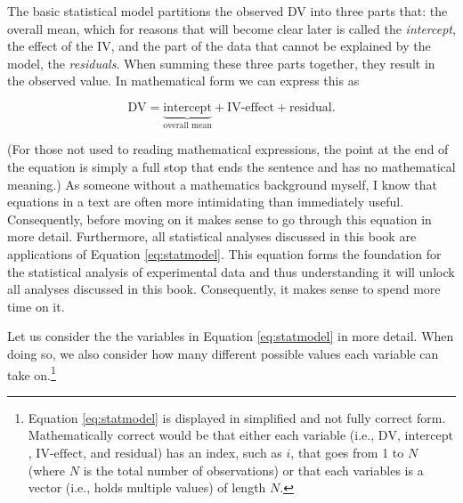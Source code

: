 \documentclass[
]{book}
\begin{document}
The basic statistical model partitions the observed DV into three parts that: the overall mean, which for reasons that will become clear later is called the \emph{intercept}, the effect of the IV, and the part of the data that cannot be explained by the model, the \emph{residuals}. When summing these three parts together, they result in the observed value. In mathematical form we can express this as

\begin{equation}
\text{DV} = \underbrace{\text{intercept}}_{\text{overall mean}} + \text{IV-effect} + \text{residual}.
\label{eq:statmodel}
\end{equation}

(For those not used to reading mathematical expressions, the point at the end of the equation is simply a full stop that ends the sentence and has no mathematical meaning.) As someone without a mathematics background myself, I know that equations in a text are often more intimidating than immediately useful. Consequently, before moving on it makes sense to go through this equation in more detail. Furthermore, all statistical analyses discussed in this book are applications of Equation \eqref{eq:statmodel}. This equation forms the foundation for the statistical analysis of experimental data and thus understanding it will unlock all analyses discussed in this book. Consequently, it makes sense to spend more time on it.

Let us consider the the variables in Equation \eqref{eq:statmodel} in more detail. When doing so, we also consider how many different possible values each variable can take on.\footnote{Equation \eqref{eq:statmodel} is displayed in simplified and not fully correct form. Mathematically correct would be that either each variable (i.e., \(\text{DV}\), \(\text{intercept}\), \(\text{IV-effect}\), and \(\text{residual}\)) has an index, such as \(i\), that goes from 1 to \(N\) (where \(N\) is the total number of observations) or that each variables is a vector (i.e., holds multiple values) of length \(N\).}
\end{document}
